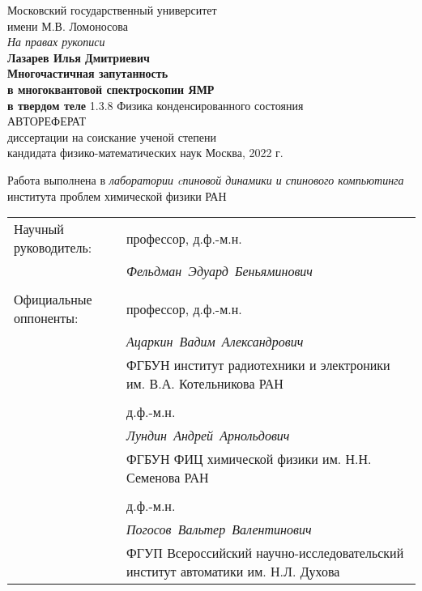 \begin{titlepage}
\vfill
\begin{center}
  {\large
    Московский государственный университет \\
    имени М.В. Ломоносова
  } \\
  \vfill
  \hfill \textit{На правах рукописи} \\
  \vfill
  {\Large \bf Лазарев Илья Дмитриевич} \\
  \vspace{1cm}
  {\Large \bf
      Многочастичная запутанность \\
      в многоквантовой спектроскопии ЯМР \\
      \vspace{2mm}
      в твердом теле
  }
 \vfill
  1.3.8 Физика конденсированного состояния \\
 \vspace{1cm}
 АВТОРЕФЕРАТ \\
 диссертации на соискание ученой степени \\
 кандидата физико-математических наук
 \vfill
 Москва, 2022 г.
\end{center}
\end{titlepage}

Работа выполнена в \textit{лаборатории cпиновой динамики и спинового компьютинга} института проблем химической физики РАН

\vfill

\begin{tabularx}{\textwidth}{
  >{\raggedright\arraybackslash}X
  >{\raggedright\arraybackslash}X
}%
Научный руководитель: & профессор, д.ф.-м.н. \\
 & \mbox{\textit{Фельдман Эдуард Беньяминович}} \\
 & \\
Официальные оппоненты:
& профессор, д.ф.-м.н. \\ 
& \mbox{\textit{Ацаркин Вадим Александрович}} \\ 
& ФГБУН институт радиотехники и электроники им. В.А. Котельникова РАН \\
& \\
& д.ф.-м.н. \\
& \mbox{\textit{Лундин Андрей Арнольдович}} \\
& ФГБУН ФИЦ химической физики им. Н.Н. Семенова РАН \\
& \\
& д.ф.-м.н. \\
& \mbox{\textit{Погосов Вальтер Валентинович}} \\
& ФГУП Всероссийский научно-исследовательский институт автоматики им. Н.Л. Духова 
\end{tabularx}

